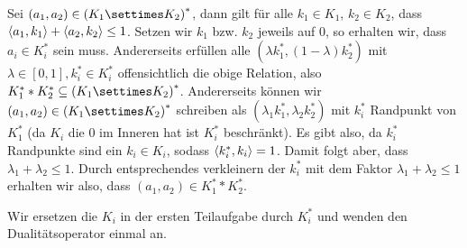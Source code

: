 \documentclass{article}
\begin{document}
\begin{solution}
    \begin{tasks}
        \item
        Sei $(a_1,a_2)\in {(K_1\settimes K_2)}^{\ast}$, dann gilt für alle $k_1\in K_1$, $k_2\in K_2$, dass $\left\langle a_1,k_1 \right\rangle+\left\langle a_2,k_2 \right\rangle\leq 1$. Setzen wir $k_1$ bzw. $k_2$ jeweils auf $0$, so erhalten wir, dass $a_i\in K_i^{\ast}$ sein muss. Andererseits erfüllen alle $(\lambda k_1^{\ast},(1-\lambda)k_2^{\ast})$ mit $\lambda\in[0,1], k_i^{\ast}\in K_i^{\ast}$ offensichtlich die obige Relation, also $K_1^{\ast}\ast K_2^{\ast}\setleq {(K_1\settimes K_2)}^{\ast}$. Andererseits können wir $(a_1,a_2)\in {(K_1\settimes K_2)}^{\ast}$ schreiben als $(\lambda_1 k_1^{\ast},\lambda_2 k_2^{\ast})$ mit $k_i^{\ast}$ Randpunkt von $K_1^{\ast}$ (da $K_i$ die $0$ im Inneren hat ist $K_i^{\ast}$ beschränkt). Es gibt also, da $k_i^{\ast}$ Randpunkte sind ein $k_i\in K_i$, sodass $\left\langle k_i^{\ast},k_i \right\rangle=1$. Damit folgt aber, dass $\lambda_1+\lambda_2\leq 1$. Durch entsprechendes verkleinern der $k_i^{\ast}$ mit dem Faktor $\lambda_1+\lambda_2\leq 1$ erhalten wir also, dass $(a_1,a_2)\in K_1^{\ast}\ast K_2^{\ast}$. 
        \item Wir ersetzen die $K_i$ in der ersten Teilaufgabe durch $K_i^{\ast}$ und wenden den Dualitätsoperator einmal an.
    \end{tasks}
\end{solution}
\end{document}
